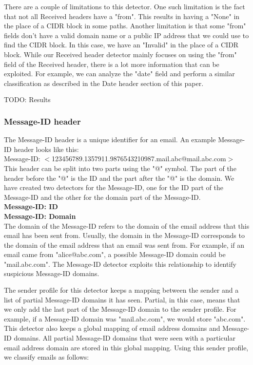 \documentclass[letterpaper]{article}
\begin{document}
There are a couple of limitations to this detector. One such limitation is the fact that not all Received headers have a "from". This results in having a "None" in the place of a CIDR block in some paths. Another limitation is that some "from" fields don't have a valid domain name or a public IP address that we could use to find the CIDR block. In this case, we have an "Invalid" in the place of a CIDR block. While our Received header detector mainly focuses on using the "from" field of the Received header, there is a lot more information that can be exploited. For example, we can analyze the "date" field and perform a similar classification as described in the Date header section of this paper.

TODO: Results

\subsubsection{Message-ID header}

The Message-ID header is a unique identifier for an email. An example Message-ID header looks like this:\\

Message-ID: $<$123456789.1357911.9876543210987.mail.abc@mail.abc.com$>$\\

This header can be split into two parts using the "@" symbol. The part of the header before the "@" is the ID and the part after the "@" is the domain. We have created two detectors for the Message-ID, one for the ID part of the Message-ID and the other for the domain part of the Message-ID.\\

\textbf{Message-ID: ID}\\

\textbf{Message-ID: Domain}\\

The domain of the Message-ID refers to the domain of the email address that this email has been sent from. Usually, the domain in the Message-ID corresponds to the domain of the email address that an email was sent from. For example, if an email came from "alice@abc.com", a possible Message-ID domain could be "mail.abc.com". The Message-ID detector exploits this relationship to identify suspicious Message-ID domains.

The sender profile for this detector keeps a mapping between the sender and a list of partial Message-ID domains it has seen. Partial, in this case, means that we only add the last part of the Message-ID domain to the sender profile. For example, if a Message-ID domain was "mail.abc.com", we would store "abc.com". This detector also keeps a global mapping of email address domains and Message-ID domains. All partial Message-ID domains that were seen with a particular email address domain are stored in this global mapping. Using this sender profile, we classify emails as follows:
\end{document}
